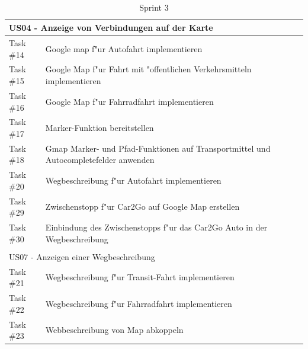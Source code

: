 \documentclass[a4paper, 11pt]{scrreprt}
\begin{document}
\begin{table}[H]

\caption{Sprint 3}

\ \\

\par

\label{tab:Sprint 3}

\centering

\begin{tabular}{|p{2.5cm} p{12cm}| ll}

\hline
\multicolumn{2}{|l|}{US04 - Anzeige von Verbindungen auf der Karte} \\

\hline
Task \#14 & Google map f"ur Autofahrt implementieren\\

\hline
Task \#15 & Google Map f"ur Fahrt mit "offentlichen Verkehrsmitteln implementieren\\

\hline
Task \#16 & Google Map f"ur Fahrradfahrt implementieren\\

\hline
Task \#17 & Marker-Funktion bereitstellen\\

\hline
Task \#18 & Gmap Marker- und Pfad-Funktionen auf Transportmittel und Autocompletefelder anwenden\\

\hline
Task \#20 & Wegbeschreibung f"ur Autofahrt implementieren\\

\hline
Task \#29 & Zwischenstopp f"ur Car2Go auf Google Map erstellen\\

\hline
Task \#30 & Einbindung des Zwischenstopps f"ur das Car2Go Auto in der Wegbeschreibung\\

\hline
\multicolumn{2}{l}{}\\

\hline
\multicolumn{2}{|l|}{US07 - Anzeigen einer Wegbeschreibung}\\

\hline
Task \#21 & Wegbeschreibung f"ur Transit-Fahrt implementieren\\

\hline
Task \#22 & Wegbeschreibung f"ur Fahrradfahrt implementieren\\

\hline
Task \#23 & Webbeschreibung von Map abkoppeln\\

\hline
\end{tabular}

\end{table}
\end{document}

